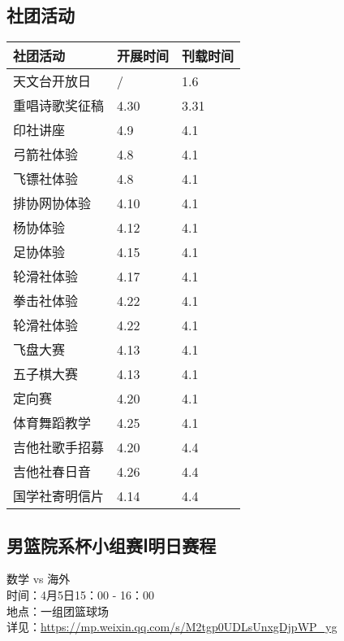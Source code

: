 \documentclass[letterpaper, 12pt]{article}
\begin{document}
\begin{multicols}{2}
\section{社团活动}
\begin{tabular}{|>{\centering\arraybackslash}m{}|m{}|m{}|}
    \hline
    社团活动 & 开展时间 & 刊载时间\\
    \hline\hline
    天文台开放日 & / & 1.6\\
    重唱诗歌奖征稿 & 4.30 & 3.31\\
    印社讲座 & 4.9 & 4.1\\
    弓箭社体验 & 4.8 & 4.1\\
    飞镖社体验 & 4.8 & 4.1\\
    排协网协体验 & 4.10 & 4.1\\
    杨协体验 & 4.12 & 4.1\\
    足协体验 & 4.15 & 4.1\\
    轮滑社体验 & 4.17 & 4.1\\
    拳击社体验 & 4.22 & 4.1\\
    轮滑社体验 & 4.22 & 4.1\\
    飞盘大赛 & 4.13 & 4.1\\
    五子棋大赛 & 4.13 & 4.1\\
    定向赛 & 4.20 & 4.1\\
    体育舞蹈教学 & 4.25 & 4.1\\
    吉他社歌手招募 & 4.20 & 4.4\\
    吉他社春日音 & 4.26 & 4.4\\
    国学社寄明信片 & 4.14 & 4.4\\
    \hline
\end{tabular}
\subsection{男篮院系杯小组赛Ⅰ明日赛程}
数学 vs 海外
\\时间：4月5日15：00 - 16：00
\\地点：一组团篮球场
\\详见：\url{https://mp.weixin.qq.com/s/M2tgp0UDLsUnxgDjpWP_yg}

\end{multicols}
\end{document}
